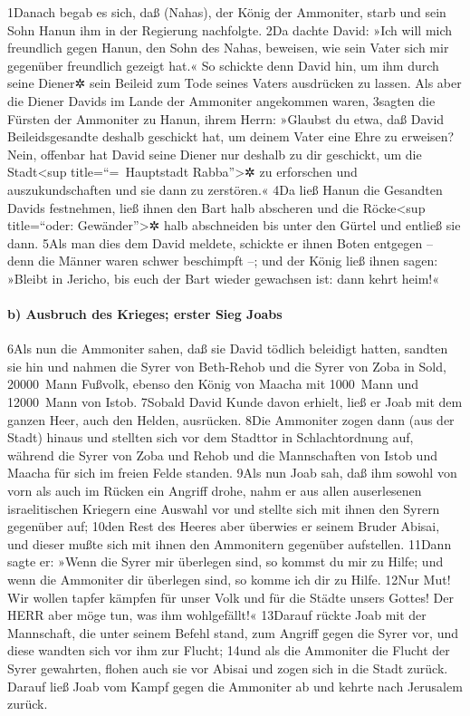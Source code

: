1Danach begab es sich, daß (Nahas), der König der Ammoniter, starb und
sein Sohn Hanun ihm in der Regierung nachfolgte. 2Da dachte David: »Ich
will mich freundlich gegen Hanun, den Sohn des Nahas, beweisen, wie sein
Vater sich mir gegenüber freundlich gezeigt hat.« So schickte denn David
hin, um ihm durch seine Diener✲ sein Beileid zum Tode seines Vaters
ausdrücken zu lassen. Als aber die Diener Davids im Lande der Ammoniter
angekommen waren, 3sagten die Fürsten der Ammoniter zu Hanun, ihrem
Herrn: »Glaubst du etwa, daß David Beileidsgesandte deshalb geschickt
hat, um deinem Vater eine Ehre zu erweisen? Nein, offenbar hat David
seine Diener nur deshalb zu dir geschickt, um die Stadt\textless sup
title=``=~Hauptstadt Rabba''\textgreater✲ zu erforschen und
auszukundschaften und sie dann zu zerstören.« 4Da ließ Hanun die
Gesandten Davids festnehmen, ließ ihnen den Bart halb abscheren und die
Röcke\textless sup title=``oder: Gewänder''\textgreater✲ halb
abschneiden bis unter den Gürtel und entließ sie dann. 5Als man dies dem
David meldete, schickte er ihnen Boten entgegen -- denn die Männer waren
schwer beschimpft --; und der König ließ ihnen sagen: »Bleibt in
Jericho, bis euch der Bart wieder gewachsen ist: dann kehrt heim!«

\hypertarget{b-ausbruch-des-krieges-erster-sieg-joabs}{%
\paragraph{b) Ausbruch des Krieges; erster Sieg
Joabs}\label{b-ausbruch-des-krieges-erster-sieg-joabs}}

6Als nun die Ammoniter sahen, daß sie David tödlich beleidigt hatten,
sandten sie hin und nahmen die Syrer von Beth-Rehob und die Syrer von
Zoba in Sold, 20000~Mann Fußvolk, ebenso den König von Maacha mit
1000~Mann und 12000~Mann von Istob. 7Sobald David Kunde davon erhielt,
ließ er Joab mit dem ganzen Heer, auch den Helden, ausrücken. 8Die
Ammoniter zogen dann (aus der Stadt) hinaus und stellten sich vor dem
Stadttor in Schlachtordnung auf, während die Syrer von Zoba und Rehob
und die Mannschaften von Istob und Maacha für sich im freien Felde
standen. 9Als nun Joab sah, daß ihm sowohl von vorn als auch im Rücken
ein Angriff drohe, nahm er aus allen auserlesenen israelitischen
Kriegern eine Auswahl vor und stellte sich mit ihnen den Syrern
gegenüber auf; 10den Rest des Heeres aber überwies er seinem Bruder
Abisai, und dieser mußte sich mit ihnen den Ammonitern gegenüber
aufstellen. 11Dann sagte er: »Wenn die Syrer mir überlegen sind, so
kommst du mir zu Hilfe; und wenn die Ammoniter dir überlegen sind, so
komme ich dir zu Hilfe. 12Nur Mut! Wir wollen tapfer kämpfen für unser
Volk und für die Städte unsers Gottes! Der HERR aber möge tun, was ihm
wohlgefällt!« 13Darauf rückte Joab mit der Mannschaft, die unter seinem
Befehl stand, zum Angriff gegen die Syrer vor, und diese wandten sich
vor ihm zur Flucht; 14und als die Ammoniter die Flucht der Syrer
gewahrten, flohen auch sie vor Abisai und zogen sich in die Stadt
zurück. Darauf ließ Joab vom Kampf gegen die Ammoniter ab und kehrte
nach Jerusalem zurück.

